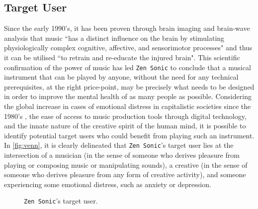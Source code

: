 \documentclass[12pt]{article}
\begin{document}
\subsection{Target User}
Since the early 1990's, it has been proven through brain imaging and brain-wave analysis that music ``has a distinct influence on the brain by stimulating physiologically complex cognitive, affective, and sensorimotor processes" and thus it can be utilised ``to retrain and re-educate the injured brain"\cite{Neuro}.  This scientific confirmation of the power of music has led \texttt{Zen Sonic} to conclude that a musical instrument that can be played by anyone, without the need for any technical prerequisites, at the right price-point, may be precisely what needs to be designed in order to improve the mental health of as many people as possible. Considering the global increase in cases of emotional distress in capitalistic societies since the 1980's \cite{Sedated}, the ease of access to music production tools through digital technology, and the innate nature of the creative spirit of the human mind, it is possible to identify potential target users who could benefit from playing such an instrument. In \autoref{fig:venn}, it is clearly delineated that \texttt{Zen Sonic}'s target user lies at the intersection of a musician (in the sense of someone who derives pleasure from playing or composing music or manipulating sounds), a creative (in the sense of someone who derives pleasure from any form of creative activity), and someone experiencing some emotional distress, such as anxiety or depression.
\begin{figure}[ht]
    \centering
    \caption{\texttt{Zen Sonic}'s target user.}%
    \label{fig:venn}
\end{figure}
\end{document}
